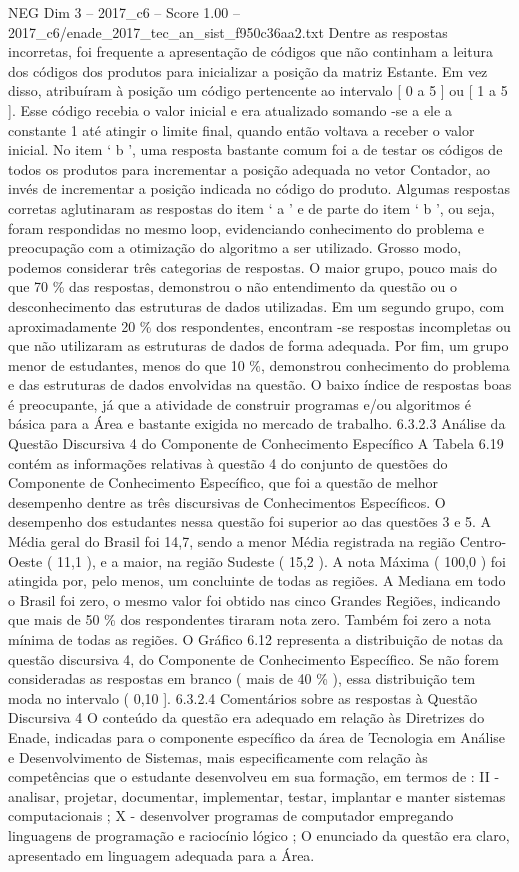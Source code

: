 \begin{textsample}{NEG Dim 3 – 2017\_c6 – Score 1.00 – 2017\_c6/enade\_2017\_tec\_an\_sist\_f950c36aa2.txt}
Dentre as respostas incorretas, foi frequente a apresentação de códigos que não continham a leitura dos códigos dos produtos para inicializar a posição da matriz Estante.
Em vez disso, atribuíram à posição um código pertencente ao intervalo [ 0 a 5 ] ou [ 1 a 5 ].
Esse código recebia o valor inicial e era atualizado somando -se a ele a constante 1 até atingir o limite final, quando então voltava a receber o valor inicial.
No item ‘ b ’, uma resposta bastante comum foi a de testar os códigos de todos os produtos para incrementar a posição adequada no vetor Contador, ao invés de incrementar a posição indicada no código do produto.
Algumas respostas corretas aglutinaram as respostas do item ‘ a ’ e de parte do item ‘ b ’, ou seja, foram respondidas no mesmo loop, evidenciando conhecimento do problema e preocupação com a otimização do algoritmo a ser utilizado.
Grosso modo, podemos considerar três categorias de respostas.
O maior grupo, pouco mais do que 70 \% das respostas, demonstrou o não entendimento da questão ou o desconhecimento das estruturas de dados utilizadas.
Em um segundo grupo, com aproximadamente 20 \% dos respondentes, encontram -se respostas incompletas ou que não utilizaram as estruturas de dados de forma adequada.
Por fim, um grupo menor de estudantes, menos do que 10 \%, demonstrou conhecimento do problema e das estruturas de dados envolvidas na questão.
O baixo índice de respostas boas é preocupante, já que a atividade de construir programas e/ou algoritmos é básica para a Área e bastante exigida no mercado de trabalho. 6.3.2.3 Análise da Questão Discursiva 4 do Componente de Conhecimento Específico A Tabela 6.19 contém as informações relativas à questão 4 do conjunto de questões do Componente de Conhecimento Específico, que foi a questão de melhor desempenho dentre as três discursivas de Conhecimentos Específicos.
O desempenho dos estudantes nessa questão foi superior ao das questões 3 e 5.
A Média geral do Brasil foi 14,7, sendo a menor Média registrada na região Centro-Oeste ( 11,1 ), e a maior, na região Sudeste ( 15,2 ).
A nota Máxima ( 100,0 ) foi atingida por, pelo menos, um concluinte de todas as regiões.
A Mediana em todo o Brasil foi zero, o mesmo valor foi obtido nas cinco Grandes Regiões, indicando que mais de 50 \% dos respondentes tiraram nota zero.
Também foi zero a nota mínima de todas as regiões.
O Gráfico 6.12 representa a distribuição de notas da questão discursiva 4, do Componente de Conhecimento Específico.
Se não forem consideradas as respostas em branco ( mais de 40 \% ), essa distribuição tem moda no intervalo ( 0,10 ]. 6.3.2.4 Comentários sobre as respostas à Questão Discursiva 4 O conteúdo da questão era adequado em relação às Diretrizes do Enade, indicadas para o componente específico da área de Tecnologia em Análise e Desenvolvimento de Sistemas, mais especificamente com relação às competências que o estudante desenvolveu em sua formação, em termos de : II - analisar, projetar, documentar, implementar, testar, implantar e manter sistemas computacionais ; X - desenvolver programas de computador empregando linguagens de programação e raciocínio lógico ; O enunciado da questão era claro, apresentado em linguagem adequada para a Área.

\end{textsample}
